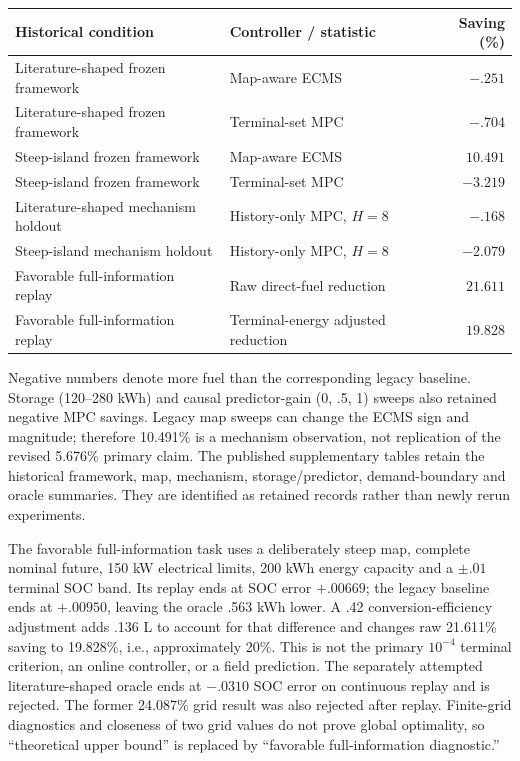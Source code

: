 \documentclass[11pt,a4paper]{article}
\begin{document}
\begin{center}\small\begin{tabularx}{\linewidth}{@{}Xlr@{}}\toprule
Historical condition & Controller / statistic & Saving (\%)\\\midrule
Literature-shaped frozen framework & Map-aware ECMS & $-.251$\\
Literature-shaped frozen framework & Terminal-set MPC & $-.704$\\
Steep-island frozen framework & Map-aware ECMS & $10.491$\\
Steep-island frozen framework & Terminal-set MPC & $-3.219$\\
Literature-shaped mechanism holdout & History-only MPC, $H=8$ & $-.168$\\
Steep-island mechanism holdout & History-only MPC, $H=8$ & $-2.079$\\
Favorable full-information replay & Raw direct-fuel reduction & $21.611$\\
Favorable full-information replay & Terminal-energy adjusted reduction & $19.828$\\\bottomrule
\end{tabularx}\end{center}
Negative numbers denote more fuel than the corresponding legacy baseline. Storage (120--280 kWh) and causal predictor-gain (0, .5, 1) sweeps also retained negative MPC savings. Legacy map sweeps can change the ECMS sign and magnitude; therefore 10.491\% is a mechanism observation, not replication of the revised 5.676\% primary claim. The published supplementary tables retain the historical framework, map, mechanism, storage/predictor, demand-boundary and oracle summaries. They are identified as retained records rather than newly rerun experiments.

The favorable full-information task uses a deliberately steep map, complete nominal future, 150 kW electrical limits, 200 kWh energy capacity and a $\pm.01$ terminal SOC band. Its replay ends at SOC error $+.00669$; the legacy baseline ends at $+.00950$, leaving the oracle .563 kWh lower. A .42 conversion-efficiency adjustment adds .136 L to account for that difference and changes raw 21.611\% saving to 19.828\%, i.e., approximately 20\%. This is not the primary $10^{-4}$ terminal criterion, an online controller, or a field prediction. The separately attempted literature-shaped oracle ends at $-.0310$ SOC error on continuous replay and is rejected. The former 24.087\% grid result was also rejected after replay. Finite-grid diagnostics and closeness of two grid values do not prove global optimality, so ``theoretical upper bound'' is replaced by ``favorable full-information diagnostic.''
\end{document}
